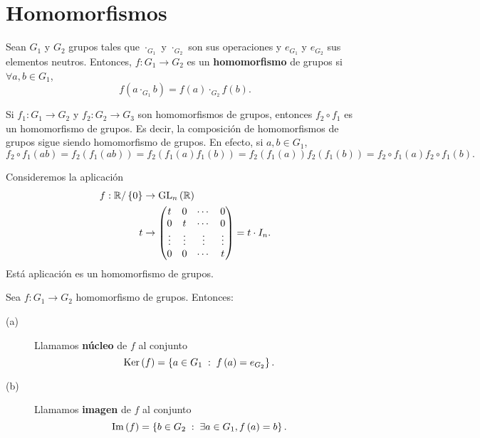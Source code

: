 \section{Homomorfismos}
\begin{definition}[Homomorfismo]
Sean $\displaystyle G_{1} $ y $\displaystyle G_{2} $ grupos tales que $\displaystyle \cdot _{G_{1}} $ y $\displaystyle \cdot _{G_{2}} $ son sus operaciones y $\displaystyle e_{G_{1}} $ y $\displaystyle e_{G_{2}} $ sus elementos neutros. Entonces, $\displaystyle f : G_{1} \to G_{2} $ es un \textbf{homomorfismo} de grupos si $\displaystyle \forall a,b \in G_{1} $, 
\[f\left(a \cdot _{G_{1}} b\right) = f\left(a\right) \cdot _{G_{2}}f\left(b\right) .\]
\end{definition}
\begin{observation}
Si $\displaystyle f_{1}: G_{1} \to G_{2} $ y $\displaystyle f_{2} : G_{2} \to G_{3} $ son homomorfismos de grupos, entonces $\displaystyle f_{2} \circ f_{1} $ es un homomorfismo de grupos. Es decir, la composición de homomorfismos de grupos sigue siendo homomorfismo de grupos. En efecto, si $\displaystyle a,b \in G_{1} $, 
\[f_{2}\circ f_{1}\left(ab\right) = f_{2}\left(f_{1}\left(ab\right)\right) = f_{2}\left(f_{1}\left(a\right)f_{1}\left(b\right)\right) = f_{2}\left(f_{1}\left(a\right)\right)f_{2}\left(f_{1}\left(b\right)\right) = f_{2} \circ f_{1}\left(a\right) f_{2}\circ f_{1}\left(b\right).\]
\end{observation}
\begin{eg}
Consideremos la aplicación 
\[
\begin{split}
	f : \mathbb{R}/ \left\{ 0\right\}  & \to \operatorname{GL}_{n}\left(\mathbb{R}\right) \\
	t & \to \begin{pmatrix} t & 0 & \cdots & 0 \\
	0 & t & \cdots & 0 \\
\vdots & \vdots & \vdots & \vdots \\
0 & 0 & \cdots & t\end{pmatrix} = t \cdot I_{n}.
\end{split}
\]
Está aplicación es un homomorfismo de grupos.
\end{eg}
\begin{definition}
Sea $\displaystyle f : G_{1} \to G_{2} $ homomorfismo de grupos. Entonces:
\begin{description}
\item[(a)] Llamamos \textbf{núcleo} de $\displaystyle f $ al conjunto
	\[\operatorname{Ker}\left(f\right) = \left\{ a \in G_{1} \; : \; f\left(a\right) = e _{G_{2}}\right\}  .\]
\item[(b)] Llamamos \textbf{imagen} de $\displaystyle f $ al conjunto
	\[\operatorname{Im}\left(f\right) = \left\{ b \in G_{2} \; : \; \exists a \in G_{1}, f\left(a\right) = b\right\}  .\]
\end{description}
\end{definition}
